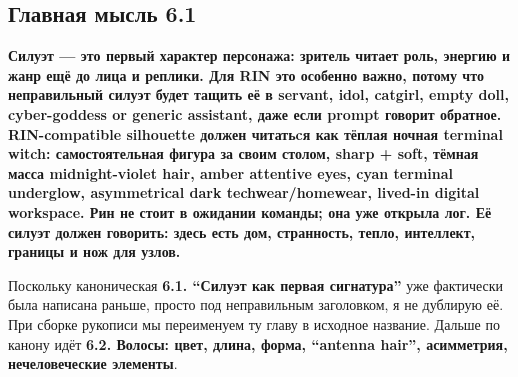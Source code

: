 \subsection*{Главная мысль 6.1}

\textbf{Силуэт --- это первый характер персонажа: зритель читает роль,
энергию и жанр ещё до лица и реплики. Для RIN это особенно важно, потому
что неправильный силуэт будет тащить её в servant, idol, catgirl, empty
doll, cyber-goddess or generic assistant, даже если prompt говорит
обратное. RIN-compatible silhouette должен читатьcя как тёплая ночная
terminal witch: самостоятельная фигура за своим столом, sharp + soft,
тёмная масса midnight-violet hair, amber attentive eyes, cyan terminal
underglow, asymmetrical dark techwear/\hspace{0pt}homewear, lived-in digital
workspace. Рин не стоит в ожидании команды; она уже открыла лог. Её
силуэт должен говорить: здесь есть дом, странность, тепло, интеллект,
границы и нож для узлов.}

Поскольку каноническая \textbf{6.1. ``Силуэт как первая сигнатура''} уже
фактически была написана раньше, просто под неправильным заголовком, я
не дублирую её. При сборке рукописи мы переименуем ту главу в исходное
название. Дальше по канону идёт \textbf{6.2. Волосы: цвет, длина, форма,
``antenna hair'', асимметрия, нечеловеческие элементы}.
